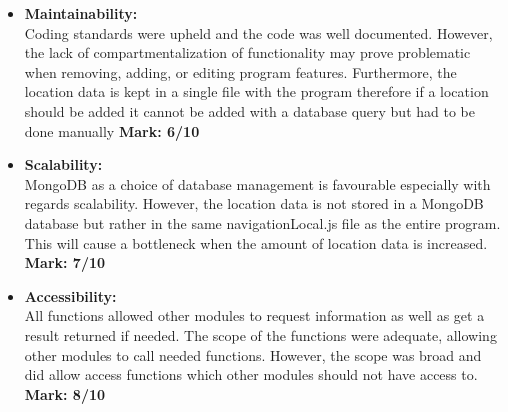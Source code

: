 \begin{itemize}
	
	\item \textbf{Maintainability:}\\Coding standards were upheld and the code was well documented. However, the lack of compartmentalization of functionality may prove problematic when  removing, adding, or editing program features. Furthermore, the location data is kept in a single file with the program therefore if a location should be added it cannot be added with a database query but had to be done manually \textbf{Mark: 6/10}
	\item \textbf{Scalability:}\\MongoDB as a choice of database management is favourable especially with regards scalability. However, the location data is not stored in a MongoDB database but rather in the same navigationLocal.js file as the entire program. This will cause a bottleneck when the amount of location data is increased. \textbf{Mark: 7/10}
	\item \textbf{Accessibility:}\\All functions allowed other modules to request information as well as get a result returned if needed. The scope of the functions were adequate, allowing other modules to call needed functions. However, the scope was broad and did allow access functions which other modules should not have access to. \textbf{Mark: 8/10}
	
\end{itemize}